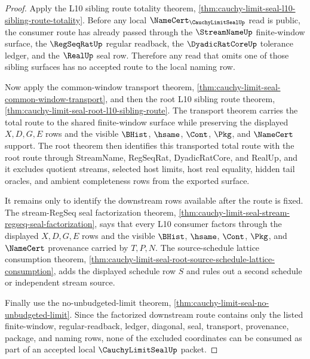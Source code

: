 \begin{proof}
Apply the L10 sibling route totality theorem, \autoref{thm:cauchy-limit-seal-l10-sibling-route-totality}. Before any local $\NameCert_{\CauchyLimitSealUp}$ read is public, the consumer route has already passed through the $\StreamNameUp$ finite-window surface, the $\RegSeqRatUp$ regular readback, the $\DyadicRatCoreUp$ tolerance ledger, and the $\RealUp$ seal row. Therefore any read that omits one of those sibling surfaces has no accepted route to the local naming row.

Now apply the common-window transport theorem, \autoref{thm:cauchy-limit-seal-common-window-transport}, and then the root L10 sibling route theorem, \autoref{thm:cauchy-limit-seal-root-l10-sibling-route}. The transport theorem carries the total route to the shared finite-window surface while preserving the displayed $X,D,G,E$ rows and the visible $\BHist$, $\hsame$, $\Cont$, $\Pkg$, and $\NameCert$ support. The root theorem then identifies this transported total route with the root route through StreamName, RegSeqRat, DyadicRatCore, and RealUp, and it excludes quotient streams, selected host limits, host real equality, hidden tail oracles, and ambient completeness rows from the exported surface.

It remains only to identify the downstream rows available after the route is fixed. The stream-RegSeq seal factorization theorem, \autoref{thm:cauchy-limit-seal-stream-regseq-seal-factorization}, says that every L10 consumer factors through the displayed $X,D,G,E$ rows and the visible $\BHist$, $\hsame$, $\Cont$, $\Pkg$, and $\NameCert$ provenance carried by $T,P,N$. The source-schedule lattice consumption theorem, \autoref{thm:cauchy-limit-seal-root-source-schedule-lattice-consumption}, adds the displayed schedule row $S$ and rules out a second schedule or independent stream source.

Finally use the no-unbudgeted-limit theorem, \autoref{thm:cauchy-limit-seal-no-unbudgeted-limit}. Since the factorized downstream route contains only the listed finite-window, regular-readback, ledger, diagonal, seal, transport, provenance, package, and naming rows, none of the excluded coordinates can be consumed as part of an accepted local $\CauchyLimitSealUp$ packet.
\end{proof}

